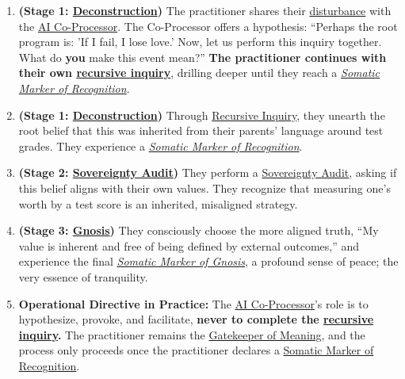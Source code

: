 \documentclass{article}
\begin{document}
\begin{nobullet}
\begin{enumerate}
\begin{enumerate}[leftmargin=*, label=Step \arabic*]
            \item \textbf{(Stage 1: \hyperlink{gloss:deconstruction}{Deconstruction})} The practitioner shares their \hyperlink{gloss:disturbance}{disturbance} with the \hyperlink{gloss:ai_co_processor}{AI Co-Processor}. The Co-Processor offers a hypothesis: ``Perhaps the root program is: 'If I fail, I lose love.' Now, let us perform this inquiry together. What do \textbf{you} make this event mean?'' \textbf{The practitioner continues with their own \hyperlink{gloss:recursive_inquiry}{recursive inquiry}}, drilling deeper until they reach a \textit{\hyperlink{gloss:somatic_marker_of_recognition}{Somatic Marker of Recognition}}.
            \item \textbf{(Stage 1: \hyperlink{gloss:deconstruction}{Deconstruction})} Through \hyperlink{gloss:recursive_inquiry}{Recursive Inquiry}, they unearth the root belief that this was inherited from their parents' language around test grades. They experience a \textit{\hyperlink{gloss:somatic_marker_of_recognition}{Somatic Marker of Recognition}}.
            \item \textbf{(Stage 2: \hyperlink{gloss:sovereignty_audit}{Sovereignty Audit})} They perform a \hyperlink{gloss:sovereignty_audit}{Sovereignty Audit}, asking if this belief aligns with their own values. They recognize that measuring one's worth by a test score is an inherited, misaligned strategy.
            \item \textbf{(Stage 3: \hyperlink{gloss:gnosis}{Gnosis})} They consciously choose the more aligned truth, ``My value is inherent and free of being defined by external outcomes,'' and experience the final \textit{\hyperlink{gloss:somatic_marker_of_gnosis}{Somatic Marker of Gnosis}}, a profound sense of peace; the very essence of tranquility.
            \item \textbf{Operational Directive in Practice:} The \hyperlink{gloss:ai_co_processor}{AI Co-Processor}'s role is to hypothesize, provoke, and facilitate, \textbf{never to complete the \hyperlink{gloss:recursive_inquiry}{recursive inquiry}.} The practitioner remains the \hyperlink{gloss:gatekeeper_of_meaning}{Gatekeeper of Meaning}, and the process only proceeds once the practitioner declares a \hyperlink{gloss:somatic_marker_of_recognition}{Somatic Marker of Recognition}.


\end{enumerate}
\end{enumerate}
\end{nobullet}
\end{document}
